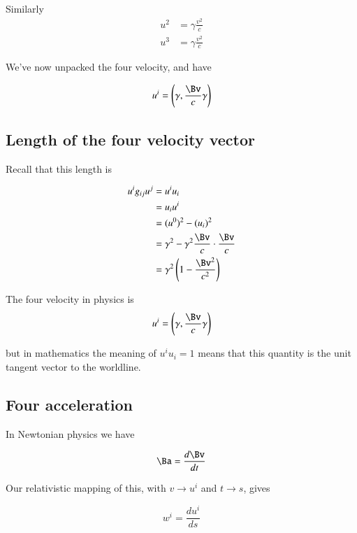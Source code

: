 Similarly
\begin{align*}
u^2 &= \gamma \frac{v^2}{c} \\
u^3 &= \gamma \frac{v^2}{c}
\end{align*}

We've now unpacked the four velocity, and have

\begin{equation}\label{eqn:relativisticElectrodynamicsL7:100}
u^i = \left( \gamma, \frac{\Bv}{c} \gamma \right)
\end{equation}

\subsection{Length of the four velocity vector}

Recall that this length is

\begin{align*}
u^i g_{ij} u^j 
&= u^i u_i  \\
&= u_i u^i  \\
&= (u^0)^2 - (u_i)^2 \\
&= \gamma^2 - \gamma^2 \frac{\Bv}{c} \cdot \frac{\Bv}{c} \\
&= \gamma^2 \left(1 - \frac{\Bv^2}{c^2} \right)
\end{align*}

The four velocity in physics is
\begin{equation}\label{eqn:relativisticElectrodynamicsL7:110}
u^i = \left( \gamma, \frac{\Bv}{c} \gamma \right)
\end{equation}

but in mathematics the meaning of $u^i u_i = 1$ means that this quantity is the unit tangent vector to the worldline.

\subsection{Four acceleration}

In Newtonian physics we have 

\begin{equation}\label{eqn:relativisticElectrodynamicsL7:111}
\Ba = \frac{d\Bv}{dt}
\end{equation}

Our relativistic mapping of this, with $v \rightarrow u^i$ and $t \rightarrow s$, gives

\begin{equation}\label{eqn:relativisticElectrodynamicsL7:120}
w^i = \frac{d u^i}{ds}
\end{equation}

